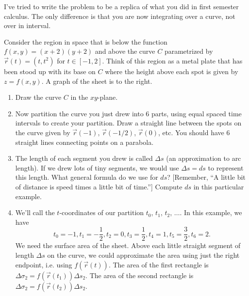 I've tried to write the problem to be a replica of what you did in first semester calculus.  The only difference is that you are now integrating over a curve, not over in interval. 

%
\begin{problem}%
%
 Consider the region in space that is below the function 
$f(x,y)=(x+2)(y+2)$ and above the curve $C$ parametrized by 
$\vec r(t)=(t,t^2)$ for $t\in[-1,2]$.  Think of this region as a metal plate that has been stood up with its base on $C$ where the height above each spot is given by $z=f(x,y)$. A graph of the sheet is to the right.
%
\begin{enumerate}
 \item Draw the curve $C$ in the $xy$-plane.
 \item Now partition the curve you just drew into 6 parts, using equal spaced time intervals to create your partition. Draw a straight line between the spots on the curve given by $\vec r(-1)$, $\vec r(-1/2)$, $\vec r(0)$, etc.  You should have 6 straight lines connecting points on a parabola.
 \item The length of each segment you drew is called $\Delta s$ (an approximation to arc length). If we drew lots of tiny segments, we would use $\Delta s=ds$ to represent this length.  What general formula do we use for $ds$? [Remember, ``A little bit of distance is speed times a little bit of time.''] Compute $ds$ in this particular example.
 \item We'll call the $t$-coordinates of our partition $t_0$, $t_1$, $t_2$, $\ldots$. In this example, we have 
$$
t_0=-1, 
t_1=-\frac{1}{2}, 
t_2=0, 
t_3=\frac{1}{2}, 
t_4=1, 
t_5=\frac{3}{2}, 
t_6=2.
$$
We need the surface area of the sheet. Above each little straight segment of length $\Delta s$ on the curve, we could approximate the area using just the right endpoint, i.e. using $f(\vec r(t))$. 
The area of the first rectangle is  
$\Delta \sigma_2=f(\vec r(t_1))\Delta s_2$. The area of the second rectangle is $\Delta \sigma_2=f(\vec r(t_2))\Delta s_2$. 


\end{enumerate}
\end{problem}
